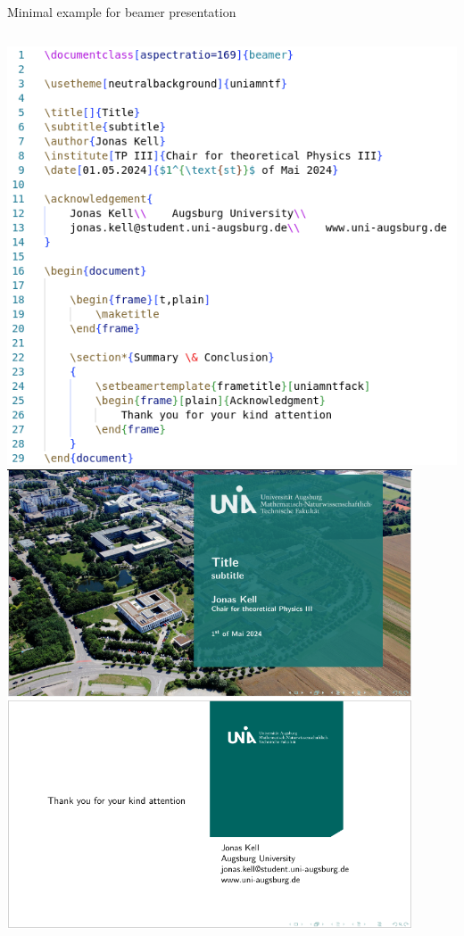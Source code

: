 \documentclass[aspectratio=169,handout]{beamer} %
\begin{document}
    \begin{frame}{Minimal example for beamer presentation}
        \begin{columns}
                \includegraphics[width=1.1\textwidth]{./beamer-minimal-example/code.png}
                \includegraphics[width=0.9\textwidth]{./beamer-minimal-example/result.png}
        \end{columns}
    \end{frame}
\end{document}
